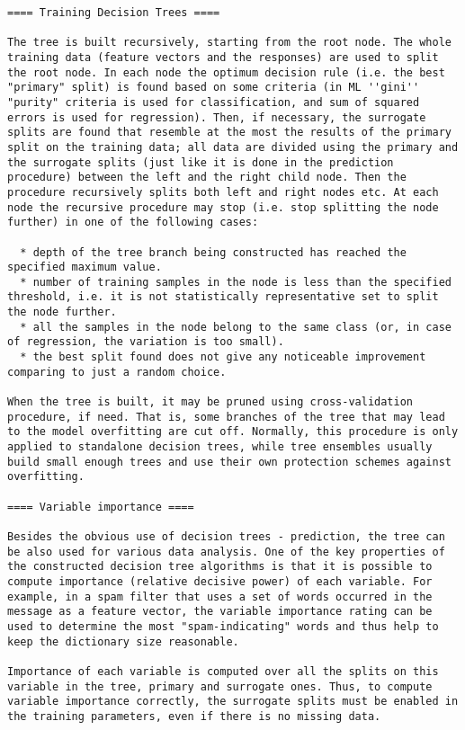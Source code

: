 \begin{verbatim}
==== Training Decision Trees ====

The tree is built recursively, starting from the root node. The whole training data (feature vectors and the responses) are used to split the root node. In each node the optimum decision rule (i.e. the best "primary" split) is found based on some criteria (in ML ''gini'' "purity" criteria is used for classification, and sum of squared errors is used for regression). Then, if necessary, the surrogate splits are found that resemble at the most the results of the primary split on the training data; all data are divided using the primary and the surrogate splits (just like it is done in the prediction procedure) between the left and the right child node. Then the procedure recursively splits both left and right nodes etc. At each node the recursive procedure may stop (i.e. stop splitting the node further) in one of the following cases:

  * depth of the tree branch being constructed has reached the specified maximum value.
  * number of training samples in the node is less than the specified threshold, i.e. it is not statistically representative set to split the node further.
  * all the samples in the node belong to the same class (or, in case of regression, the variation is too small).
  * the best split found does not give any noticeable improvement comparing to just a random choice.

When the tree is built, it may be pruned using cross-validation procedure, if need. That is, some branches of the tree that may lead to the model overfitting are cut off. Normally, this procedure is only applied to standalone decision trees, while tree ensembles usually build small enough trees and use their own protection schemes against overfitting.

==== Variable importance ====

Besides the obvious use of decision trees - prediction, the tree can be also used for various data analysis. One of the key properties of the constructed decision tree algorithms is that it is possible to compute importance (relative decisive power) of each variable. For example, in a spam filter that uses a set of words occurred in the message as a feature vector, the variable importance rating can be used to determine the most "spam-indicating" words and thus help to keep the dictionary size reasonable.

Importance of each variable is computed over all the splits on this variable in the tree, primary and surrogate ones. Thus, to compute variable importance correctly, the surrogate splits must be enabled in the training parameters, even if there is no missing data.


\end{verbatim}
